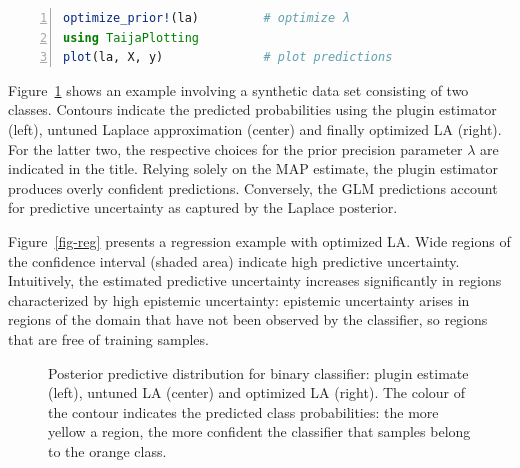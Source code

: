 \documentclass{juliacon}
\begin{document}
\begin{lstlisting}[language=Julia, escapechar=@, numbers=left, label={lst:other}, caption={Prior optimization and visualization of the predictive distribution.}]
optimize_prior!(la)         # optimize λ
using TaijaPlotting
plot(la, X, y)              # plot predictions
\end{lstlisting}

Figure~\ref{fig-class} shows an example involving a synthetic data set
consisting of two classes. Contours indicate the predicted probabilities
using the plugin estimator (left), untuned Laplace approximation
(center) and finally optimized LA (right). For the latter two, the
respective choices for the prior precision parameter \(\lambda\) are
indicated in the title. Relying solely on the MAP estimate, the plugin
estimator produces overly confident predictions. Conversely, the GLM
predictions account for predictive uncertainty as captured by the
Laplace posterior.

Figure~\ref{fig-reg} presents a regression example with optimized LA.
Wide regions of the confidence interval (shaded area) indicate high
predictive uncertainty. Intuitively, the estimated predictive
uncertainty increases significantly in regions characterized by high
epistemic uncertainty: epistemic uncertainty arises in regions of the
domain that have not been observed by the classifier, so regions that
are free of training samples.

\begin{figure}


\caption{\label{fig-class}Posterior predictive distribution for binary
classifier: plugin estimate (left), untuned LA (center) and optimized LA
(right). The colour of the contour indicates the predicted class
probabilities: the more yellow a region, the more confident the
classifier that samples belong to the orange class.}

\end{figure}%
\end{document}
